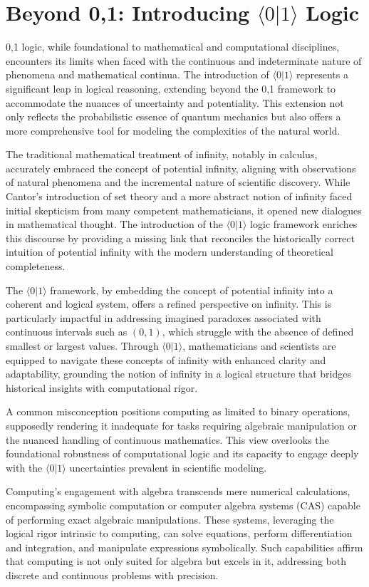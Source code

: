 \documentclass[12pt]{article}
\newcommand{\qbit}{\langle 0 | 1 \rangle}
\begin{document}
\section*{Beyond {0,1}: Introducing \(\qbit\) Logic}
 {0,1} logic, while foundational to mathematical and computational disciplines, encounters its limits when faced with the continuous and indeterminate nature of phenomena and mathematical continua. The introduction of \(\qbit\) represents a significant leap in logical reasoning, extending beyond the {0,1} framework to accommodate the nuances of uncertainty and potentiality. This extension not only reflects the probabilistic essence of quantum mechanics but also offers a more comprehensive tool for modeling the complexities of the natural world.

The traditional mathematical treatment of infinity, notably in calculus, accurately embraced the concept of potential infinity, aligning with observations of natural phenomena and the incremental nature of scientific discovery. While Cantor's introduction of set theory and a more abstract notion of infinity faced initial skepticism from many competent mathematicians, it opened new dialogues in mathematical thought. The introduction of the \(\qbit\) logic framework enriches this discourse by providing a missing link that reconciles the historically correct intuition of potential infinity with the modern understanding of theoretical completeness.

The \(\qbit\) framework, by embedding the concept of potential infinity into a coherent and logical system, offers a refined perspective on infinity. This is particularly impactful in addressing imagined paradoxes associated with continuous intervals such as \((0,1)\), which struggle with the absence of defined smallest or largest values. Through \(\qbit\), mathematicians and scientists are equipped to navigate these concepts of infinity with enhanced clarity and adaptability, grounding the notion of infinity in a logical structure that bridges historical insights with computational rigor.

A common misconception positions computing as limited to binary operations, supposedly rendering it inadequate for tasks requiring algebraic manipulation or the nuanced handling of continuous mathematics. This view overlooks the foundational robustness of computational logic and its capacity to engage deeply with the \(\qbit\) uncertainties prevalent in scientific modeling.

Computing's engagement with algebra transcends mere numerical calculations, encompassing symbolic computation or computer algebra systems (CAS) capable of performing exact algebraic manipulations. These systems, leveraging the logical rigor intrinsic to computing, can solve equations, perform differentiation and integration, and manipulate expressions symbolically. Such capabilities affirm that computing is not only suited for algebra but excels in it, addressing both discrete and continuous problems with precision.
\end{document}
